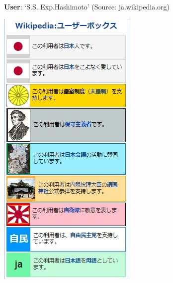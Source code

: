 \documentclass[10pt,british,A4paper,twoside]{memoir}
\begin{document}
\begin{figure}[!htb]
\begin{subfigure}[b]{0.3\textwidth}
 \caption{\textbf{User}: `S.S. Exp.Hashimoto' (Source: ja.wikipedia.org)}
 \label{fig:hashimoto}
 \end{subfigure}
 \begin{subfigure}[b]{0.3\textwidth}
 \includegraphics[width=\textwidth]{images/wiki/defense-corps.jpg}

\end{subfigure}
\end{figure}
\end{document}
